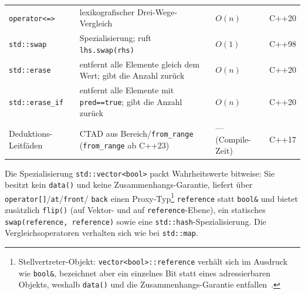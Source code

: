 \begin{longtable}{@{}>{\raggedright\arraybackslash}p{3.1cm} >{\raggedright\arraybackslash}p{5.7cm} >{\raggedright\arraybackslash}p{2.7cm} >{\raggedright\arraybackslash}p{1.1cm}@{}}
  \texttt{operator<=>} & lexikografischer Drei-Wege-Vergleich & $O(n)$ & C++20 \\
  \texttt{std::swap} & Spezialisierung; ruft \texttt{lhs.swap(rhs)} & $O(1)$ & C++98 \\
  \texttt{std::erase} & entfernt alle Elemente gleich dem Wert; gibt die Anzahl zurück & $O(n)$ & C++20 \\
  \texttt{std::erase\_if} & entfernt alle Elemente mit \texttt{pred==true}; gibt die Anzahl zurück & $O(n)$ & C++20 \\
  Deduktions-Leitfäden & CTAD aus Bereich/\allowbreak\texttt{from\_range} (\texttt{from\_range} ab C++23) & --- (Compile-Zeit) & C++17 \\
  \bottomrule
\end{longtable}

\noindent Die Spezialisierung \texttt{std::vector<bool>} packt Wahrheitswerte bitweise: Sie besitzt kein
\texttt{data()} und keine Zusammenhangs-Garantie, liefert über \texttt{operator[]}/\texttt{at}/\texttt{front}/%
\texttt{back} einen Proxy-Typ\footnote{Stellvertreter-Objekt: \texttt{vector<bool>::reference}
verhält sich im Ausdruck wie \texttt{bool\&}, bezeichnet aber ein einzelnes Bit statt eines
adressierbaren Objekts, weshalb \texttt{data()} und die Zusammenhangs-Garantie
entfallen~\cite{iso_cpp}.} \texttt{reference} statt \texttt{bool\&} und bietet zusätzlich \texttt{flip()}
(auf Vektor- und auf \texttt{reference}-Ebene), ein statisches
\texttt{swap(reference,\allowbreak\ reference)} sowie eine \texttt{std::hash}-Spezialisierung. Die
Vergleichsoperatoren verhalten sich wie bei \texttt{std::map}.

